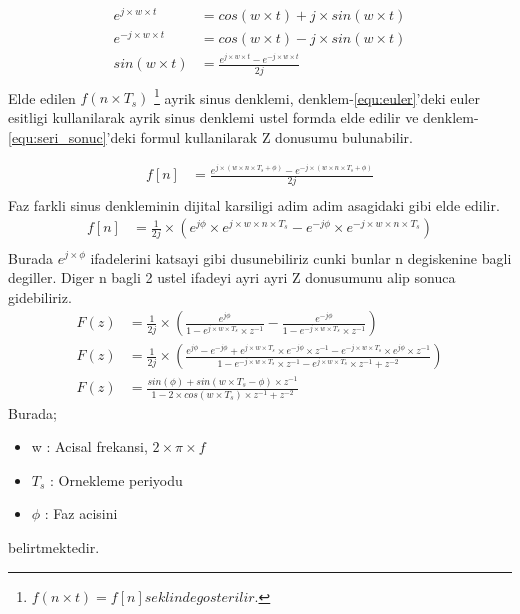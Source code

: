 \documentclass[10pt,a4paper]{article}
\begin{document}
\begin{equation} \label{equ:euler} 
\begin{split}
	e^{j \times w \times t} 	&= cos(w \times t) + j \times sin(w \times t) \\
	e^{-j \times w \times t} &= cos(w \times t) - j \times sin(w \times t) \\
	sin(w \times t) &= \frac{e^{j \times w \times t} - e^{-j \times w \times t}}{2j} \\
\end{split}					
\end{equation}
Elde edilen $f(n \times T_s)$ \footnote{$f(n \times t) = f[n] seklinde gosterilir.$} ayrik sinus denklemi, denklem-\ref{equ:euler}'deki euler esitligi kullanilarak ayrik sinus denklemi ustel formda elde edilir ve denklem-\ref{equ:seri_sonuc}'deki formul kullanilarak Z donusumu bulunabilir.

\begin{equation} \label{equ:ayrik_sin_euler} 
\begin{split}
	f[n] &= \frac{e^{j \times (w \times n \times T_s + \phi)} - e^{-j \times (w \times n \times T_s + \phi)}}{2j} \\
\end{split}					
\end{equation}
Faz farkli sinus denkleminin dijital karsiligi adim adim asagidaki gibi elde edilir.
\begin{equation} \label{equ:ayrik_sin_z_don1} 
\begin{split}
	f[n] &= \frac{1}{2j} \times  (e^{j \phi} \times e^{j \times w \times n \times T_s} - e^{-j\phi} \times e^{-j \times w \times n \times T_s})\\
\end{split}					
\end{equation}
Burada $e^{j \times \phi}$ ifadelerini katsayi gibi dusunebiliriz cunki bunlar n degiskenine bagli degiller. Diger n bagli 2 ustel ifadeyi ayri ayri Z donusumunu alip sonuca gidebiliriz.
\begin{equation} \label{equ:ayrik_sin_z_don2} 
\begin{split}
	F(z) &= \frac{1}{2j} \times (\frac{e^{j \phi}}{1 - e^{j \times w \times T_s}\times z^{-1}} - \frac{e^{-j \phi}}{1 - e^{-j \times w \times T_s}\times z^{-1}}) \\
	F(z) &= \frac{1}{2j} \times (\frac{e^{j \phi} - e^{-j \phi} + e^{j \times w \times T_s} \times e^{-j \phi} \times z^{-1} - e^{-j \times w \times T_s} \times e^{j \phi} \times z^{-1}}{1 - e^{-j \times w \times T_s} \times z^{-1} - e^{j \times w \times T_s} \times z^{-1} + z^{-2}}) \\
	F(z) &= \frac{sin(\phi) + sin(w \times T_s - \phi) \times z^{-1}}{1 - 2 \times cos(w \times T_s) \times z^{-1} + z^{-2}}
\end{split}					
\end{equation}
Burada;
\begin{itemize}
	\item w : Acisal frekansi, $2 \times \pi \times f$
	\item $T_s$ : Ornekleme periyodu
	\item $\phi$ : Faz acisini
\end{itemize}
belirtmektedir.
\end{document}

